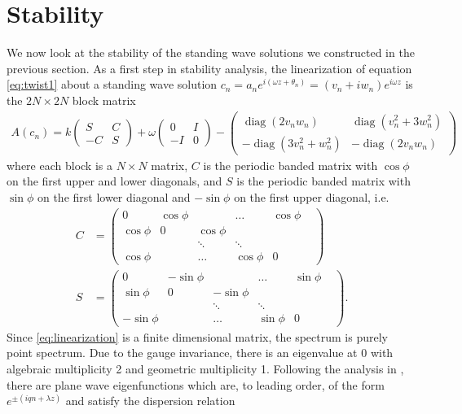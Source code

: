 \documentclass[12pt,reqno]{amsart}
\DeclareMathOperator{\diag}{diag}
\begin{document}
\section{Stability}\label{sec:stability}

We now look at the stability of the standing wave solutions we constructed in the previous section. As a first step in stability analysis, the linearization of equation \cref{eq:twist1} about a standing wave solution $c_n = a_n e^{i (\omega z + \theta_n) } = (v_n + i w_n)e^{i\omega z}$ is the $2N \times 2N$ block matrix
\begin{align}\label{eq:linearization}
A(c_n) =
k \begin{pmatrix}S & C \\ -C & S \end{pmatrix}
+ \omega\begin{pmatrix}0 & I \\ -I & 0 \end{pmatrix} 
- \begin{pmatrix} \diag(2v_n w_n) & \diag(v_n^2 + 3 w_n^2) \\
-\diag(3 v_n^2 + w_n^2) & -\diag(2v_n w_n) \end{pmatrix}
\end{align}
where each block is a $N\times N$ matrix, $C$ is the periodic banded matrix with $\cos \phi$ on the first upper and lower diagonals, and $S$ is the periodic banded matrix with $\sin \phi$ on the first lower diagonal and $-\sin \phi$ on the first upper diagonal, i.e.
\begin{align*}
C &= \begin{pmatrix}
0 & \cos \phi & & \dots & \cos \phi \\
\cos \phi & 0 & \cos \phi & & & \\
& & \ddots & \ddots &  & \\
\cos \phi & & \dots & \cos \phi & 0
\end{pmatrix} \\
S &= \begin{pmatrix}
0 & -\sin \phi & & \dots & \sin \phi \\
\sin \phi & 0 & -\sin \phi & & & \\
& & \ddots & \ddots &  & \\
-\sin \phi & & \dots & \sin \phi & 0
\end{pmatrix}.
\end{align*}
Since \cref{eq:linearization} is a finite dimensional matrix, the spectrum is purely point spectrum. Due to the gauge invariance, there is an eigenvalue at 0 with algebraic multiplicity 2 and geometric multiplicity 1. Following the analysis in \cite[Section 2.1.1.1]{Kevrekidis2009}, there are plane wave eigenfunctions which are, to leading order, of the form $e^{\pm( i q n + \lambda z)}$ and satisfy the dispersion relation
\end{document}
